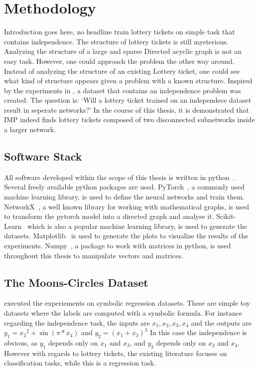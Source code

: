 \chapter{Methodology}
Introduction goes here, no headline
train lottery tickets on simple task that contains independence.
The structure of lottery tickets is still mysterious. 
Analyzing the structure of a large and sparse Directed acyclic graph is not an easy task. 
However, one could approach the problem the other way around. 
Instead of analyzing the structure of an existing Lottery ticket, one could see what kind of structure appears given a problem with a known structure.
Inspired by the experiments in \autocite{BIMT}, a dataset that contains an independence problem was created.
The question is:
`Will a lottery ticket trained on an independece dataset result in seperate networks?'
In the course of this thesis, it is demonstrated that IMP indeed finds lottery tickets composed of two disconnected subnetworks inside a larger network.

\section{Software Stack}
All software developed within the scope of this thesis is written in python~\autocite{python}.
Several freely available python packages are used.
PyTorch~\autocite{pytorch}, a commonly used machine learning library, is used to define the neural networks and train them.
NetworkX~\autocite{networkx}, a well known library for working with mathematical graphs, is used to transform the pytorch model into a directed graph and analyse it.
Scikit-Learn~\autocite{sklearn} which is also a popular machine learning library, is used to generate the datasets.
Matplotlib~\autocite{matplotlib} is used to generate the plots to visualize the results of the experiments.
Numpy~\autocite{numpy}, a package to work with matrices in python, is used throughout this thesis to manipulate vectors and matrices.

\section{The Moons-Circles Dataset}\label{sec:independece_dataset}
\textcite{BIMT} executed the experiements on symbolic regression datasets.
These are simple toy datasets where the labels are computed with a symbolic formula. 
For instance regarding the independence task, the inputs are $x_1, x_2, x_3, x_4$ and the outputs are $y_1={x_2}^2 + \sin{(\pi*x_4)}$ and $y_2={(x_1+x_3)}^3$
In this case the independence is obvious, as $y_1$ depends only on $x_1$ and $x_3$, and $y_2$ depends only on $x_2$ and $x_4$.
However with regards to lottery tickets, the existing literature focuses on classification tasks, while this is a regression task.

